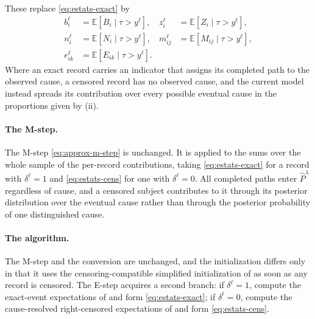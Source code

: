 \documentclass{article}
\newcommand{\ex}[1]{\mathbb{E}\left[#1\right]}
\newenvironment{aarevision}{}{}
\newcommand{\subchg}[1]{#1}
\begin{document}
\begin{aarevision}
These replace \eqref{eq:estats-exact} by
\end{aarevision}
\begin{equation}
\label{eq:estats-cens}
\begin{aligned}
b_{i}^\ell&=\ex{B_i \mid \tau>y^\ell},
&z_i^\ell&=\ex{Z_i \mid \tau>y^\ell},\\[4pt]
n_{i}^\ell&=\ex{N_i \mid \tau>y^\ell},
&m_{ij}^\ell&=\ex{M_{ij} \mid \tau>y^\ell},\\[4pt]
e_{ik}^\ell&=\ex{E_{ik} \mid \tau>y^\ell}. &&
\end{aligned}
\end{equation}
\begin{aarevision}
Where an exact record carries an indicator that assigns its completed path to the observed cause, a censored record has no observed cause, and the current model instead spreads its contribution over every possible eventual cause in the proportions given by (ii).

\paragraph{The M-step.} The M-step \eqref{eq:approx-m-step} is unchanged. It is applied to the sums over the whole sample of the per-record contributions, taking \eqref{eq:estats-exact} for a record with $\delta^\ell=1$ and \eqref{eq:estats-cens} for one with $\delta^\ell=0$. \subchg{All completed paths enter $\widehat P^\lambda$ regardless of cause, and a censored subject contributes to it through its posterior distribution over the eventual cause rather than through the posterior probability of one distinguished cause.}

\paragraph{The algorithm.} The M-step and the conversion are unchanged, and the initialization differs only in that it uses the censoring-compatible simplified initialization of  as soon as any record is censored. The E-step acquires a second branch: if $\delta^\ell=1$, compute the exact-event expectations of  and form \eqref{eq:estats-exact}; if $\delta^\ell=0$, compute the cause-resolved right-censored expectations of  and form \eqref{eq:estats-cens}.
\end{aarevision}
\end{document}
